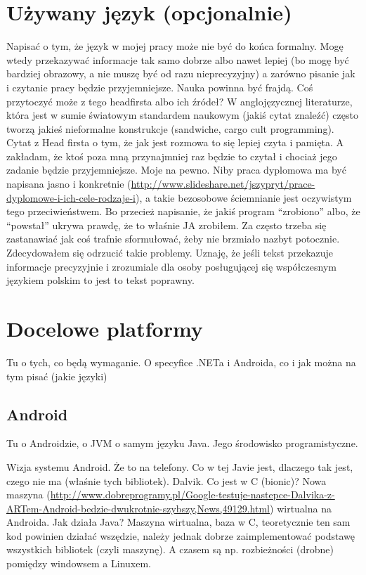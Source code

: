 \section{Używany język (opcjonalnie)}
Napisać o tym, że język w mojej pracy może nie być do końca formalny. Mogę wtedy przekazywać informacje tak samo dobrze albo nawet lepiej (bo mogę być bardziej obrazowy, a nie muszę być od razu nieprecyzyjny) a zarówno pisanie jak i czytanie pracy będzie przyjemniejsze. Nauka powinna być frajdą. Coś przytoczyć może z tego headfirsta albo ich źródeł? W anglojęzycznej literaturze, która jest w sumie światowym standardem naukowym (jakiś cytat znaleźć) często tworzą jakieś nieformalne konstrukcje (sandwiche, cargo cult programming). Cytat z Head firsta o tym, że jak jest rozmowa to się lepiej czyta i pamięta. A zakładam, że ktoś poza mną przynajmniej raz będzie to czytał i chociaż jego zadanie będzie przyjemniejsze. Moje na pewno. Niby praca dyplomowa ma być napisana jasno i konkretnie (\url{http://www.slideshare.net/jszypryt/prace-dyplomowe-i-ich-cele-rodzaje-i}), a takie bezosobowe ściemnianie jest oczywistym tego przeciwieństwem. Bo przecież napisanie, że jakiś program ``zrobiono'' albo, że ``powstał'' ukrywa prawdę, że to właśnie JA zrobiłem. Za często trzeba się zastanawiać jak coś trafnie sformułować, żeby nie brzmiało nazbyt potocznie. Zdecydowałem się odrzucić takie problemy. Uznaję, że jeśli tekst przekazuje informacje precyzyjnie i zrozumiale dla osoby posługującej się współczesnym językiem polskim to jest to tekst poprawny.

\section{Docelowe platformy}
Tu o tych, co będą wymaganie. O specyfice .NETa i Androida, co i jak można na tym pisać (jakie języki)

\subsection{Android}
Tu o Androidzie, o JVM o samym języku Java. Jego środowisko programistyczne.

Wizja systemu Android. Że to na telefony. Co w tej Javie jest, dlaczego tak jest, czego nie ma (właśnie tych bibliotek). Dalvik. Co jest w C (bionic)? Nowa maszyna (\url{http://www.dobreprogramy.pl/Google-testuje-nastepce-Dalvika-z-ARTem-Android-bedzie-dwukrotnie-szybszy,News,49129.html}) wirtualna na Androida.
Jak działa Java? Maszyna wirtualna, baza w C, teoretycznie ten sam kod powinien działać wszędzie, należy jednak dobrze zaimplementować podstawę wszystkich bibliotek (czyli maszynę). A czasem są np. rozbieżności (drobne) pomiędzy windowsem a Linuxem.

